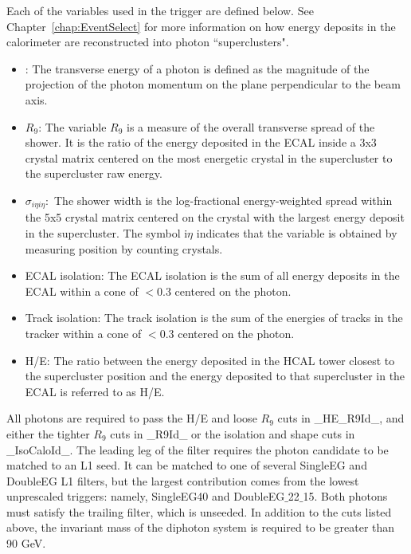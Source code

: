 Each of the variables used in the trigger are defined below. See Chapter~\ref{chap:EventSelect} for more information on how energy deposits in the calorimeter are reconstructed into photon ``superclusters".

\begin{itemize}[leftmargin=*]
\item{\ET:} The transverse energy \ET of a photon is defined
as the magnitude of the projection
of the photon momentum on the plane perpendicular to the beam axis.
\item{$R_9$:} The variable $R_9$ is
a measure of the overall transverse spread of the shower. It is the ratio
of the energy deposited in the ECAL inside a 3x3 crystal matrix centered on
the most energetic crystal in the supercluster to the supercluster
 raw energy.
\item{$\sigma_{i\eta i \eta}:$} The shower width \sigmaietaieta is
      the log-fractional energy-weighted spread within the 5x5 crystal matrix centered on the
      crystal with the largest energy deposit in the supercluster. The symbol
      i$\eta$ indicates that the variable is obtained by measuring position by
      counting crystals.
\item{ECAL isolation:} The ECAL isolation is
      the sum of all energy deposits in the ECAL within a cone of \dR
      $<$0.3 centered on the photon.
\item{Track isolation:} The track isolation is
      the sum of the energies of tracks in the tracker within a cone of \dR
      $<$0.3 centered on the photon.
\item{H/E:} The ratio between the energy deposited in the HCAL
      tower closest to the supercluster position and the energy deposited to
      that supercluster in the ECAL is referred to as H/E.
  \end{itemize}

All photons are required to pass the H/E and loose $R_9$ cuts in
\_HE\_R9Id\_, and either the tighter $R_9$ cuts in
\_R9Id\_ or the isolation and shape cuts in \_IsoCaloId\_.
The leading leg of the filter requires the photon candidate
to be matched to an L1 seed. It can be matched to one of several
SingleEG and DoubleEG L1 filters, but the largest contribution comes
from the lowest unprescaled triggers: namely, SingleEG40 and
DoubleEG$\_$22$\_$15.
Both photons must satisfy the trailing filter, which is unseeded.
In addition to the cuts listed above, the invariant mass of
the diphoton system is required to be greater than 90 GeV.

